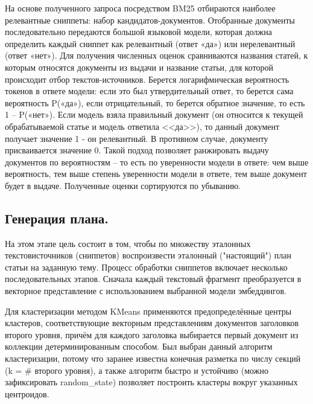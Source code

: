 \documentclass{article}
\theoremstyle{definition}
\theoremstyle{plain}
\begin{document}
На основе полученного запроса посредством BM25 отбираются наиболее релевантные сниппеты: набор кандидатов-документов. Отобранные документы последовательно передаются большой языковой модели, которая должна определить каждый сниппет как релевантный (ответ «да») или нерелевантный (ответ «нет»). 
Для получения численных оценок сравниваются названия статей, к которым относятся документы из выдачи и название статьи, для которой происходит отбор текстов-источников. 
Берется логарифмическая вероятность токенов в ответе модели: если это был утвердительный ответ, то берется сама вероятность P(«да»), если отрицательный, то берется обратное значение, то есть 1 – P(«нет»).
Если модель взяла правильный документ (он относится к текущей обрабатываемой статье и модель ответила <<да>>), то данный документ получает значение 1 - он релевантный. В противном случае, документу присваивается значение 0. 
Такой подход позволяет ранжировать выдачу документов по вероятностям – то есть по уверенности модели в ответе: чем выше вероятность, тем выше степень уверенности модели в ответе, тем выше документ будет в выдаче. Полученные оценки сортируются по убыванию. 

\subsection*{Генерация плана.}

На этом этапе цель состоит в том, чтобы по множеству эталонных текстов\-источников (сниппетов) воспроизвести эталонный ("настоящий") план статьи на заданную тему.
Процесс обработки сниппетов включает несколько последовательных этапов. 
Сначала каждый текстовый фрагмент преобразуется в векторное представление с использованием выбранной модели эмбеддингов. 

Для кластеризации методом KMeans применяются предопределённые центры кластеров, 
соответствующие векторным представлениям документов заголовков второго уровня, причём для каждого заголовка выбирается первый документ из коллекции детерминированным способом. 
Был выбран данный алгоритм кластеризации, потому что заранее известна конечная разметка по числу секций (k = \# второго уровня), а также алгоритм быстро и устойчиво (можно зафиксировать random\_state) 
позволяет построить кластеры вокруг указанных центроидов.
\end{document}
